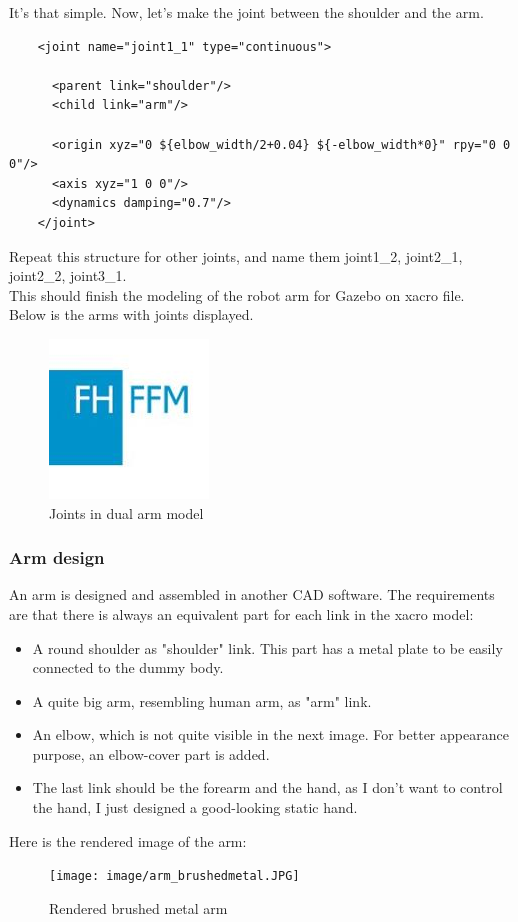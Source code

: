 \documentclass[pdftex,12pt,a4paper]{article}
\begin{document}
  \newpage
  It's that simple. Now, let's make the joint between the shoulder and the arm.
  \begin{lstlisting}
    <joint name="joint1_1" type="continuous">
    
      <parent link="shoulder"/>
      <child link="arm"/>
      
      <origin xyz="0 ${elbow_width/2+0.04} ${-elbow_width*0}" rpy="0 0 0"/>
      <axis xyz="1 0 0"/>
      <dynamics damping="0.7"/>
    </joint>
  \end{lstlisting}
  Repeat this structure for other joints, and name them joint1\_2, joint2\_1, joint2\_2, joint3\_1.\\
  This should finish the modeling of the robot arm for Gazebo on xacro file.\\
  Below is the arms with joints displayed.
  \begin{figure}[h]
      \centering
      \includegraphics[width=0.5\linewidth]{image/FH-Frankfurt.jpg}
      \caption{Joints in dual arm model}
      \label{fig:arm_gazebo_joint}
  \end{figure}
  
  \newpage
  \subsubsection{Arm design}
  An arm is designed and assembled in another CAD software. The requirements are that there is always an equivalent part for each link in the xacro model:
  \begin{itemize}
  \item A round shoulder as "shoulder" link. This part has a metal plate to be easily connected to the dummy body.
  \item A quite big arm, resembling human arm, as "arm" link.
  \item An elbow, which is not quite visible in the next image. For better appearance purpose, an elbow-cover part is added.
  \item The last link should be the forearm and the hand, as I don't want to control the hand, I just designed a good-looking static hand.
  \end{itemize}
  Here is the rendered image of the arm:
  \begin{figure}[h]
      \centering
      \texttt{[image: image/arm\_brushedmetal.JPG]}
      \caption{Rendered brushed metal arm}
      \label{fig:arm_gazebo_rendered}
  \end{figure}
  
\end{document}
